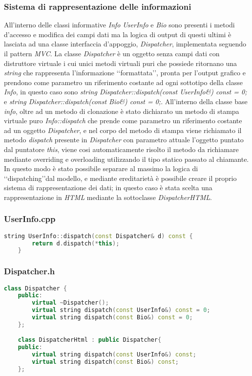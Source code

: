 \subsubsection*{Sistema di rappresentazione delle informazioni}
All'interno delle classi informative \textit{Info} \textit{UserInfo} e \textit{Bio} sono presenti i metodi d'accesso e modifica dei campi dati ma la logica di output
di questi ultimi è lasciata ad una classe interfaccia d'appoggio, \textit{Dispatcher}, implementata seguendo il pattern \textit{MVC}.
La classe \textit{Dispatcher} è un oggetto senza campi dati con distruttore virtuale i cui unici metodi virtuali puri che possiede ritornano una \textit{string} che rappresenta l'informazione \lq\lq formattata\rq\rq,  pronta per l'output grafico
e prendono come parametro un riferimento costante ad ogni sottotipo della classe \textit{Info}, in questo caso sono \textit{string Dispatcher::dispatch(const UserInfo\&) const = 0;} e \textit{string Dispatcher::dispatch(const Bio\&) const = 0;}.
All'interno della classe base \textit{info}, oltre ad un metodo di clonazione è stato dichiarato un metodo di stampa virtuale puro \textit{Info::dispatch} che prende come parametro
un riferimento costante ad un oggetto \textit{Dispatcher}, e nel corpo del metodo di stampa viene richiamato il metodo \textit{dispatch} presente in \textit{Dispatcher} con parametro attuale l'oggetto puntato dal puntatore \textit{this}, viene
cosi automaticamente risolto il metodo da richiamare mediante overriding e overloading utilizzando il tipo statico passato al chiamante.
In questo modo è stato possibile separare al massimo la logica di \lq\lq dispatching\rq\rq dal modello, e mediante ereditarietà è possibile creare il proprio sistema di rappresentazione dei dati; in questo caso è stata scelta una
rappresentazione in \textit{HTML} mediante la sottoclasse \textit{DispatcherHTML}.
\subsubsection*{UserInfo.cpp}
\begin{lstlisting}[language=C++]
    string UserInfo::dispatch(const Dispatcher& d) const {
        return d.dispatch(*this);
    }
\end{lstlisting}
\subsubsection*{Dispatcher.h}
\begin{lstlisting}[language=C++]
    class Dispatcher {
    public:
        virtual ~Dispatcher();
        virtual string dispatch(const UserInfo&) const = 0;
        virtual string dispatch(const Bio&) const = 0;
    };

    class DispatcherHtml : public Dispatcher{
    public:
        virtual string dispatch(const UserInfo&) const;
        virtual string dispatch(const Bio&) const;
    };
\end{lstlisting}